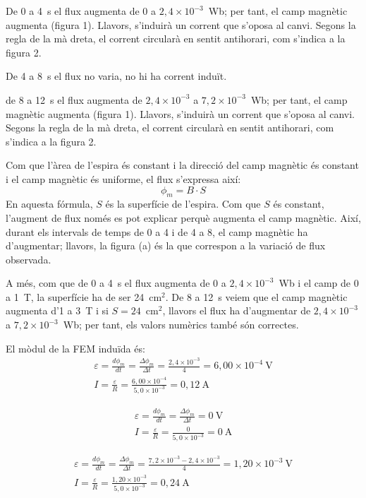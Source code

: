 \begin{solapartat}
 De 0 a 4~s el flux augmenta de 0 a $2,4\times 10^{-3}$~Wb; per tant, el camp magnètic augmenta (figura 1). Llavors, s'induirà un corrent que s'oposa al canvi. Segons la regla de la mà dreta, el corrent circularà en sentit antihorari, com s'indica a la figura 2.

 De 4 a 8~s el flux no varia, no hi ha corrent induït.

 de 8 a 12~s el flux augmenta de $2,4\times 10^{-3}$ a $7,2\times 10^{-3}$~Wb; per tant, el camp magnètic augmenta (figura 1). Llavors, s'induirà un corrent que s'oposa al canvi. Segons la regla de la mà dreta, el corrent circularà en sentit antihorari, com s'indica a la figura 2.

 Com que l'àrea de l'espira és constant i la direcció del camp magnètic és constant i el camp magnètic és uniforme, el flux s'expressa així:
\[ \phi_m = B\cdot S \]
En aquesta fórmula, $S$ és la superfície de l'espira. Com que $S$ és constant, l'augment de flux només es pot explicar perquè augmenta el camp magnètic. Així, durant els intervals de temps de 0 a 4 i de 4 a 8, el camp magnètic ha d'augmentar; llavors, la figura (a) és la que correspon a la variació de flux observada.

A més, com que de 0 a 4~s el flux augmenta de 0 a $2,4\times 10^{-3}$~Wb i el camp de 0 a 1~T, la superfície ha de ser 24~cm$^2$. De 8 a 12~s veiem que el camp magnètic augmenta d'1 a 3~T i si $S = 24$~cm$^2$, llavors el flux ha d'augmentar de $2,4\times 10^{-3}$ a $7,2\times 10^{-3}$~Wb; per tant, els valors numèrics també són correctes.
\end{solapartat}

\begin{solapartat}
 El mòdul de la FEM induïda és:
\begin{gather*}
\varepsilon = \frac{d\phi_m}{dt} = \frac{\Delta\phi_m}{\Delta t} = \frac{2,4\times 10^{-3}}{4} = 6,00\times 10^{-4}\ \mathrm{V}\\
I = \frac{\varepsilon}{R} = \frac{6,00\times 10^{-4}}{5,0\times 10^{-3}} = 0,12\ \mathrm{A}
\end{gather*}

\begin{gather*}
\varepsilon = \frac{d\phi_m}{dt} = \frac{\Delta\phi_m}{\Delta t} = 0\ \mathrm{V}\\
I = \frac{\varepsilon}{R} = \frac{0}{5,0\times 10^{-3}} = 0\ \mathrm{A}
\end{gather*}

\begin{gather*}
\varepsilon = \frac{d\phi_m}{dt} = \frac{\Delta\phi_m}{\Delta t} = \frac{7,2\times 10^{-3} - 2,4\times 10^{-3}}{4} = 1,20\times 10^{-3}\ \mathrm{V}\\
I = \frac{\varepsilon}{R} = \frac{1,20\times 10^{-3}}{5,0\times 10^{-3}} = 0,24\ \mathrm{A}
\end{gather*}
\end{solapartat}
